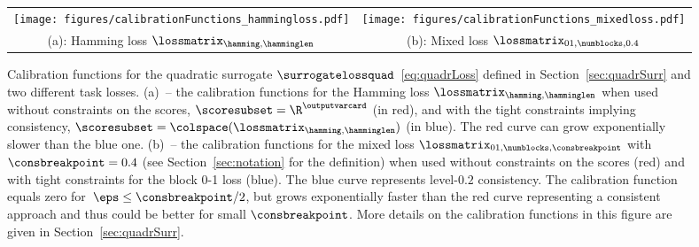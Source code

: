 \documentclass{article}
\begin{document}
%
\begin{figure}
    \begin{center}
        \begin{tabular}{c@{\qquad\qquad}c}
            \texttt{[image: figures/calibrationFunctions\_hammingloss.pdf]} 
            &
            \texttt{[image: figures/calibrationFunctions\_mixedloss.pdf]} \\
            {\footnotesize (a): Hamming loss $\lossmatrix_{\hamming,\hamminglen}$} & {\footnotesize (b): Mixed loss $\lossmatrix_{01,\numblocks,0.4}$}\\[-1mm]
        \end{tabular}
    \end{center}
    \caption{\label{fig:exampleTranferFunctions} Calibration functions for the quadratic surrogate $\surrogatelossquad$~\eqref{eq:quadrLoss} defined in Section~\ref{sec:quadrSurr} and two different task losses.
        (a)~-- the calibration functions for the Hamming loss $\lossmatrix_{\hamming,\hamminglen}$ when used without constraints on the scores, $\scoresubset = \R^\outputvarcard$ (in red), and with the tight constraints implying consistency, $\scoresubset= \colspace(\lossmatrix_{\hamming,\hamminglen})$ (in blue).
        The red curve can grow exponentially slower than the blue one. 
        (b)~-- the calibration functions for the mixed loss $\lossmatrix_{01,\numblocks,\consbreakpoint}$ with $\consbreakpoint=0.4$ (see Section~\ref{sec:notation} for the definition) when used without constraints on the scores (red) and with tight constraints for the block 0-1 loss (blue).
        The blue curve represents level-$0.2$ consistency.
        The calibration function equals zero for~$\eps \leq \consbreakpoint/2$, but grows exponentially faster than the red curve representing a consistent approach and thus could be better for small $\consbreakpoint$.
        More details on the calibration functions in this figure are given in Section~\ref{sec:quadrSurr}.}
\end{figure}
\end{document}
